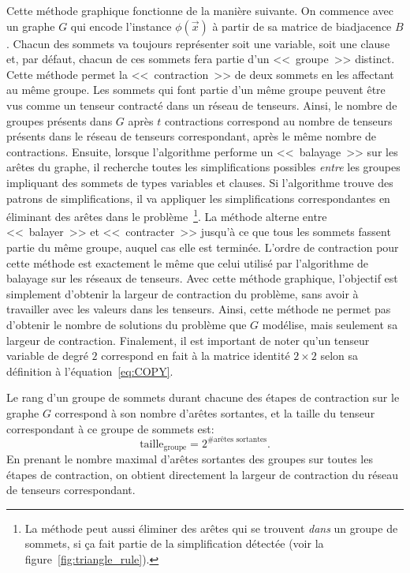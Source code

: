 Cette méthode graphique fonctionne de la manière suivante.
On commence avec un graphe $G$ qui encode l'instance $\phi(\vec{x})$ à partir de sa matrice de biadjacence $B$.
Chacun des sommets va toujours représenter soit une variable, soit une clause et, par défaut, chacun de ces sommets fera partie d'un <<~groupe~>> distinct.
Cette méthode permet la <<~contraction~>> de deux sommets en les affectant au même groupe.
Les sommets qui font partie d'un même groupe peuvent être vus comme un tenseur contracté dans un réseau de tenseurs.
Ainsi, le nombre de groupes présents dans $G$ après $t$ contractions correspond au nombre de tenseurs présents dans le réseau de tenseurs correspondant, après le même nombre de contractions.
Ensuite, lorsque l'algorithme performe un <<~balayage~>> sur les arêtes du graphe, il recherche toutes les simplifications possibles \emph{entre} les groupes impliquant des sommets de types variables et clauses.
Si l'algorithme trouve des patrons de simplifications, il va appliquer les simplifications correspondantes en éliminant des arêtes dans le problème~\footnote{La méthode peut aussi éliminer des arêtes qui se trouvent \emph{dans} un groupe de sommets, si ça fait partie de la simplification détectée (voir la figure~\ref{fig:triangle_rule}).}.
La méthode alterne entre <<~balayer~>> et <<~contracter~>> jusqu'à ce que tous les sommets fassent partie du même groupe, auquel cas elle est terminée.
L'ordre de contraction pour cette méthode est exactement le même que celui utilisé par l'algorithme de balayage sur les réseaux de tenseurs.
Avec cette méthode graphique, l'objectif est simplement d'obtenir la largeur de contraction du problème, sans avoir à travailler avec les valeurs dans les tenseurs.
Ainsi, cette méthode ne permet pas d'obtenir le nombre de solutions du problème que $G$ modélise, mais seulement sa largeur de contraction.
Finalement, il est important de noter qu'un tenseur variable de degré $2$ correspond en fait à la matrice identité $2 \times 2$ selon sa définition à l'équation~\ref{eq:COPY}.

Le rang d'un groupe de sommets durant chacune des étapes de contraction sur le graphe $G$ correspond à son nombre d'arêtes sortantes, et la taille du tenseur correspondant à ce groupe de sommets est:
\begin{equation} \label{eq:size-cluster}
    \mathrm{taille}_{\mathrm{groupe}} = 2^{\text{\#arêtes sortantes}}.
\end{equation}
En prenant le nombre maximal d'arêtes sortantes des groupes sur toutes les étapes de contraction, on obtient directement la largeur de contraction du réseau de tenseurs correspondant.

